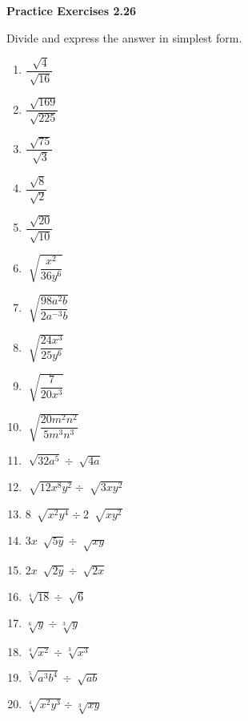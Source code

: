 \vspace{0.3ex}
\noindent\textbf{Practice Exercises 2.26}

\vspace{0.2ex}

\setlength{\columnsep}{-10pt}

Divide and express the answer in simplest form.
\begin{multicols}{3}
\begin{enumerate}[noitemsep, label = \color{blue}\arabic*. ]
\item \(\dfrac{\sqrt[]{4}}{\sqrt[]{16}}\)
\item \(\dfrac{\sqrt[]{169}}{\sqrt[]{225}}\)
\item \(\dfrac{\sqrt[]{75}}{\sqrt[]{3}}\)
\item \(\dfrac{\sqrt[]{8}}{\sqrt[]{2}}\)
\item \(\dfrac{\sqrt[]{20}}{\sqrt[]{10}}\)
\item \(\sqrt[]{\dfrac{x^{2}}{36y^{6}}}\)
\item \(\sqrt[]{\dfrac{98a^{2}b}{2a^{-3}b}}\)
\item \(\sqrt[]{\dfrac{24x^{3}}{25y^{6}}}\)
\item \(\sqrt[]{\dfrac{7}{20x^{3}}}\)
\item \(\sqrt[]{\dfrac{20m^{2}n^{2}}{5m^{3}n^{3}}}\)
\item \(\sqrt[]{32a^{5}} \div \sqrt[]{4a}\)
\item \(\sqrt[]{12x^{8}y^{2}} \div \sqrt[]{3xy^{2}}\)
\item \(8~\sqrt[]{x^{2}y^{4}} \div 2~\sqrt[]{xy^{2}}\)
\item \(3x~\sqrt[]{5y} \div \sqrt[]{xy}\)
\item \(2x~\sqrt[]{2y} \div \sqrt[]{2x}\)
\item \(\sqrt[{\scriptstyle 4}]{18} \div \sqrt[]{6}\)
\item \(\sqrt[{\scriptstyle 6}]{y} \div \sqrt[{\scriptstyle 3}]{y}\)
\item \(\sqrt[{\scriptstyle 4}]{x^{2}} \div \sqrt[{\scriptstyle 3}]{x^{3}}\)
\item \(\sqrt[{\scriptstyle 5}]{a^{3}b^{4}} \div \sqrt[]{ab}\)
\item \(\sqrt[{\scriptstyle 4}]{x^{2}y^{3}} \div \sqrt[{\scriptstyle 3}]{xy}\)
\end{enumerate}
\end{multicols}
